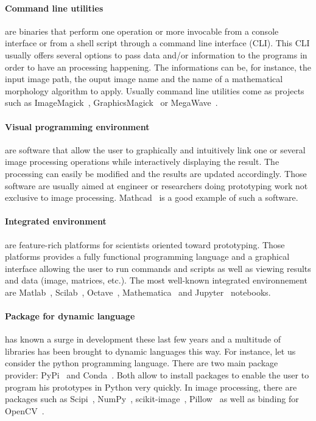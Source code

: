 \paragraph{Command line utilities} are binaries that perform one operation or more invocable from a console interface or
from a shell script through a command line interface (CLI). This CLI usually offers several options to pass data and/or
information to the programs in order to have an processing happening. The informations can be, for instance, the input
image path, the ouput image name and the name of a mathematical morphology algorithm to apply. Usually command line
utilities come as projects such as ImageMagick~\parencite{imagemagick.2021},
GraphicsMagick~\parencite{graphicsmagick.2021} or MegaWave~\parencite{froment.2012.megawave,froment.2004.megawave2}.

\paragraph{Visual programming environment} are software that allow the user to graphically and intuitively link one or
several image processing operations while interactively displaying the result. The processing can easily be modified and
the results are updated accordingly. Those software are usually aimed at engineer or researchers doing prototyping work
not exclusive to image processing. Mathcad~\parencite{ptc.mathcad.2019} is a good example of such a software.

\paragraph{Integrated environment} are feature-rich platforms for scientists oriented toward prototyping. Those
platforms provides a fully functional programming language and a graphical interface allowing the user to run commands
and scripts as well as viewing results and data (image, matrices, etc.). The most well-known integrated environnement
are Matlab~\parencite{mathworks.2020.matlab}, Scilab~\parencite{scilab.2020}, Octave~\parencite{gnu.2021.octave},
Mathematica~\parencite{wolfram.2020.mathematica} and Jupyter~\parencite{kluyver.2016.jupyter} notebooks.

\paragraph{Package for dynamic language} has known a surge in development these last few years and a multitude of
libraries has been brought to dynamic languages this way. For instance, let us consider the python programming language.
There are two main package provider: PyPi~\parencite{pypi.2021} and Conda~\parencite{anaconda.2020}. Both allow to
install packages to enable the user to program his prototypes in Python very quickly. In image processing, there are
packages such as Scipi~\parencite{jones.2006.scipy}, NumPy~\parencite{oliphant.2006.numpy},
scikit-image~\parencite{vanderWalts.2014.scikit-image}, Pillow~\parencite{clark.2021.pillow} as well as binding for
OpenCV~\parencite{bradski.2000.opencv}.


